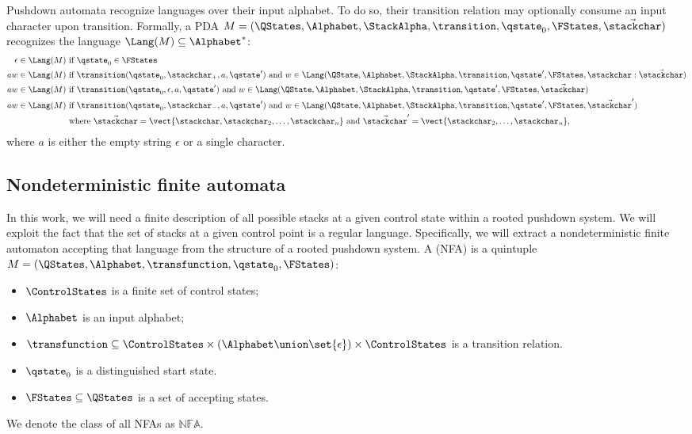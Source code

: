 Pushdown automata recognize languages over their input alphabet.
To do so, their transition relation may optionally consume an input
character upon transition.
Formally, a PDA $M = (\QStates,\Alphabet,\StackAlpha,\transition,\qstate_0,\FStates,\vec{\stackchar})$
recognizes the language $\Lang(M) \subseteq \Alphabet^*$:
\begin{align*}
\epsilon \in \Lang(M) &\text{ if }
\qstate_0 \in \FStates
\\
aw \in \Lang(M) &\text{ if }
\transition(\qstate_0,\stackchar_+,a,\qstate')
\text{ and }
w \in \Lang(\QState,\Alphabet,\StackAlpha,\transition,\qstate', \FStates, \stackchar : \vec{\stackchar})
\\
aw \in \Lang(M) &\text{ if }
\transition(\qstate_0,\epsilon,a,\qstate')
\text{ and }
w \in \Lang(\QState,\Alphabet,\StackAlpha,\transition,\qstate', \FStates, \vec{\stackchar})
\\
aw \in \Lang(M) &\text{ if }
\transition(\qstate_0,\stackchar_-,a,\qstate')
\text{ and }
w \in \Lang(\QState,\Alphabet,\StackAlpha,\transition,\qstate', \FStates, \vec{\stackchar}')
\\
&\text{ where } \vec{\stackchar} = \vect{\stackchar,\stackchar_2,\ldots,\stackchar_n}
\text{ and } \vec{\stackchar}' = \vect{\stackchar_2,\ldots,\stackchar_n}
\text,
\end{align*}
where $a$ is either the empty string $\epsilon$ or a single character.



\subsection{Nondeterministic finite automata}
In this work, we will need a finite description of 
all possible stacks at a given control state within
a rooted pushdown system.
We will exploit the fact that the set of stacks
at a given control point is a regular language.
Specifically, we will extract a nondeterministic finite automaton
accepting that language from the structure
of a rooted pushdown system.
A  (NFA) is a quintuple
$M = (\QStates, \Alphabet, \transfunction, \qstate_0, \FStates)$:
\begin{itemize}
\item $\ControlStates$ is a finite set of control states;

\item $\Alphabet$ is an input alphabet; 

\item $\transfunction 
  \subseteq
\ControlStates \times (\Alphabet \union \set{\epsilon}) 
\times \ControlStates$ 
is a transition relation.

\item $\qstate_0$ is a distinguished start state.

\item $\FStates \subseteq \QStates$ is a set of accepting states.
\end{itemize}
We denote the class of all NFAs as $\mathbb{NFA}$.


